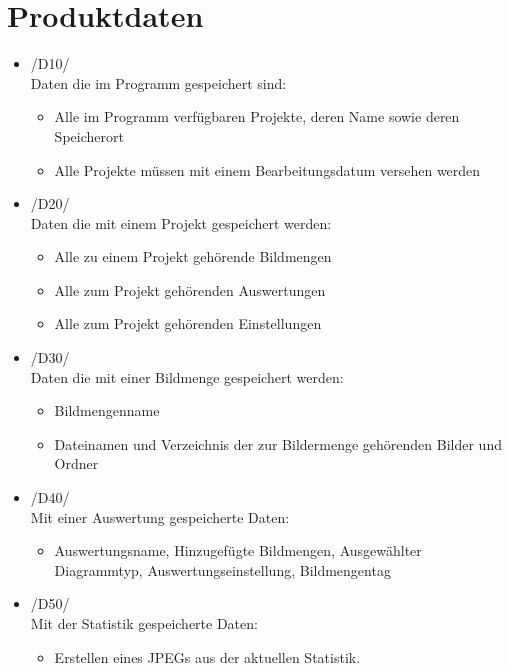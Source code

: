 \section{Produktdaten}

\begin{itemize}
	\item /D10/\\Daten die im Programm gespeichert sind:

		\begin{itemize} 
			\item Alle im Programm verfügbaren Projekte, deren Name sowie deren Speicherort
			\item Alle Projekte müssen mit einem Bearbeitungsdatum versehen werden
		\end{itemize}

	\item /D20/\\Daten die mit einem Projekt gespeichert werden:

	\begin{itemize}
			\item Alle zu einem Projekt gehörende Bildmengen
			\item Alle zum Projekt gehörenden Auswertungen
			\item Alle zum Projekt gehörenden Einstellungen
	\end{itemize}

	\item /D30/\\Daten die mit einer Bildmenge gespeichert werden:

	\begin{itemize}
		\item Bildmengenname
		\item Dateinamen und Verzeichnis der zur Bildermenge gehörenden Bilder und Ordner
	\end{itemize}
	
	\item /D40/\\Mit einer Auswertung gespeicherte Daten:
		\begin{itemize}
			\item Auswertungsname, Hinzugefügte Bildmengen, Ausgewählter Diagrammtyp, Auswertungseinstellung, Bildmengentag
		\end{itemize}
		
	\item /D50/\\ Mit der Statistik gespeicherte Daten:
		\begin{itemize}
			\item Erstellen eines JPEGs aus der aktuellen Statistik.
		\end{itemize}
	
\end{itemize}